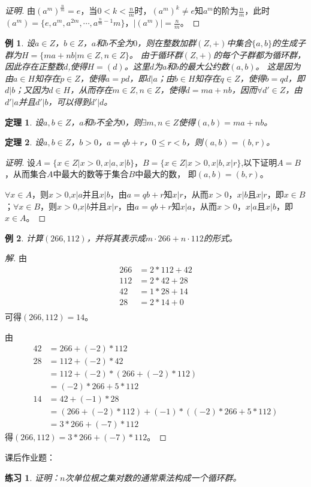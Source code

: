 \documentclass{article}
\newtheorem{Thm}{定理}
\newtheorem{Exercise}{练习}
\newtheorem*{Example}{例}
\begin{document}
\begin{CJK*}{UTF8}{gbsn}
\begin{proof}[证明]
  由$(a^m)^{\frac{n}{m}}=e$，当$0<k<\frac{n}{m}$时，$(a^m)^k\neq e$知$a^m$的阶为$\frac{n}{m}$，此时$(a^m)=\{e,a^m,a^{2m},\cdots,a^{\frac{n}{m}-1}m\}$，$|(a^m)|=\frac{n}{m}$。
\end{proof}
\begin{Example}
  设$a\in Z$，$b\in Z$，$a$和$b$不全为$0$，则在整数加群$(Z,+)$中集合$\{a,b\}$的生成子群为$H=\{ma+nb|m\in Z,n\in Z\}$。
  由于循环群$(Z,+)$的每个子群都为循环群，因此存在正整数$d$,使得$H=(d)$。这里$d$为$a$和$b$的最大公约数$(a,b)$。
  这是因为由$a\in H$知存在$p\in Z$，使得$a=pd$，即$d|a$；由$b\in H$知存在$q\in Z$，使得$b=qd$，即$d|b$；又因为$d\in H$，从而存在$m\in Z,n\in Z$，使得$d=ma+nb$，因而$\forall d'\in Z$，由$d'|a$并且$d'|b$，可以得到$d'|d$。
\end{Example}
\begin{Thm}
  设$a,b\in Z$，$a$和$b$不全为$0$，则$\exists m,n\in Z$使得$(a,b)=ma+nb$。
\end{Thm}
\begin{Thm}
  设$a,b\in Z$，$b>0$，$a=qb+r$，$0\leq r < b$，则$(a,b)=(b,r)$。
\end{Thm}
\begin{proof}[证明]
  设$A=\{x\in Z|x>0,x|a,x|b\}$，$B=\{x\in Z|x>0,x|b,x|r\}$,以下证明$A=B$，从而集合$A$中最大的数等于集合$B$中最大的数，
  即$(a,b)=(b,r)$。

  $\forall x\in A$，则$x>0$,$x|a$并且$x|b$，由$a=qb+r$知$x|r$，从而$x>0$，$x|b$且$x|r$，即$x\in B$；$\forall x\in B$，则$x>0$,$x|b$并且$x|r$，由$a=qb+r$知$x|a$，从而$x>0$，$x|a$且$x|b$，即$x\in A$。
\end{proof}
\begin{Example}
  计算$(266,112)$，并将其表示成$m\cdot 266 + n\cdot 112$的形式。
\end{Example}
\begin{proof}[解]
  由
  \begin{align*}
    266&=2*112+42\\
    112&=2*42+28\\
    42&=1*28+14\\
    28&=2*14+0\\
  \end{align*}
可得$(266,112)=14$。

由
\begin{align*}
  42&=266+(-2)*112\\
  28&=112+(-2)*42\\
  &=112+(-2)*(266+(-2)*112)\\
  &=(-2)*266+5*112\\
  14&=42+(-1)*28\\
  &=(266+(-2)*112)+(-1)*((-2)*266+5*112)\\
  &=3*266+(-7)*112
\end{align*}
得$(266,112)=3*266+(-7)*112$。
\end{proof}
课后作业题：
\begin{Exercise}
证明：$n$次单位根之集对数的通常乘法构成一个循环群。
\end{Exercise}


\end{CJK*}
\end{document}
